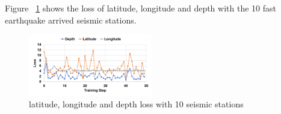 Figure ~\ref{fig:center_each} shows the loss of latitude, longitude and depth with the 10 fast earthquake arrived seismic stations.

\begin{figure}[t]
\includegraphics[width=0.48\textwidth]{figs/center_loss_detail_10.pdf}
\caption{latitude, longitude and depth loss with 10 seismic stations}
\label{fig:center_each}
\end{figure}

